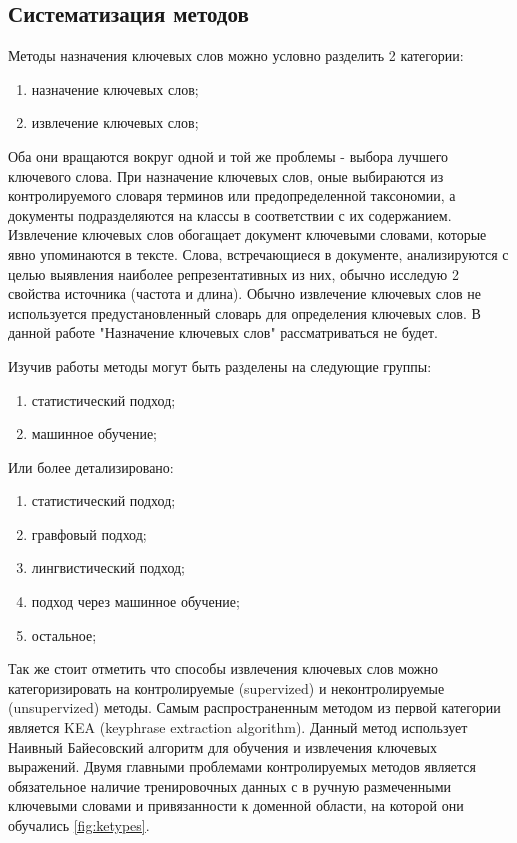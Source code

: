 \subsection{Систематизация методов}

Методы назначения ключевых слов можно условно разделить 2 категории:
\begin{enumerate}
	\item назначение ключевых слов;
	\item извлечение ключевых слов;
\end{enumerate}

Оба они вращаются вокруг одной и той же проблемы - выбора лучшего ключевого слова.
При назначение ключевых слов, оные выбираются из контролируемого словаря терминов или предопределенной таксономии, а документы подразделяются на классы в соответствии с их содержанием.
Извлечение ключевых слов обогащает документ ключевыми словами, которые явно упоминаются в тексте.
Слова, встречающиеся в документе, анализируются с целью выявления наиболее репрезентативных из них, обычно исследую 2 свойства источника (частота и длина).
Обычно извлечение ключевых слов не используется предустановленный словарь для определения ключевых слов.
В данной работе "Назначение ключевых слов" рассматриваться не будет.

Изучив работы \cite{8} методы могут быть разделены на следующие группы:
\begin{enumerate}
	\item статистический подход;
	\item машинное обучение;
\end{enumerate}
Или более детализировано:
\begin{enumerate}
	\item статистический подход;
	\item гравфовый подход;
	\item лингвистический подход;
	\item подход через машинное обучение;
	\item остальное;
\end{enumerate}

Так же стоит отметить что способы извлечения ключевых слов можно категоризировать на контролируемые (supervized) и неконтролируемые (unsupervized) методы.
Самым распространенным методом из первой категории является KEA (keyphrase extraction algorithm).
Данный метод использует Наивный Байесовский алгоритм для обучения и извлечения ключевых выражений.
Двумя главными проблемами контролируемых методов является обязательное наличие тренировочных данных с в ручную размеченными ключевыми словами и привязанности к доменной области, на которой они обучались \ref{fig:ketypes}.

